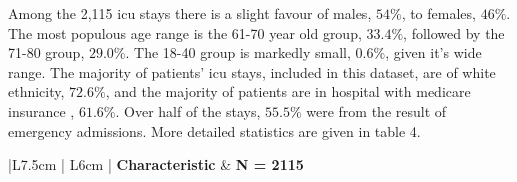 \documentclass[11pt]{article}
\begin{document}
Among the 2,115 \gls{icu} stays there is a slight favour of males, \(54\%\), to females, \(46\%\).  The most populous age range is the 61-70  year old group, \(33.4\%\), followed by the 71-80 group, \(29.0\%\). The 18-40 group is markedly small, \(0.6\%\),  given it's wide range. The majority of patients' \gls{icu} stays, included in this dataset, are of white ethnicity, \(72.6\%\), and the majority of patients are in hospital with medicare insurance , \(61.6\%\). Over half of the stays, \(55.5\%\) were from the result of emergency admissions. More detailed statistics are given in table 4.

{\seriffont
{\small
\renewcommand{\arraystretch}{1}
\begin{center}

\setlength{\arrayrulewidth}{0.7mm}
\begin{longtable}{ |L{7.5cm} | L{6cm} |} 
    \hline
    \textbf{Characteristic} & \textbf{N = 2115}\\
    \noalign{\global\setlength{\arrayrulewidth}{0.7mm}}
    \hline
    \endfirsthead


\end{longtable}
\end{center}}}
\end{document}
